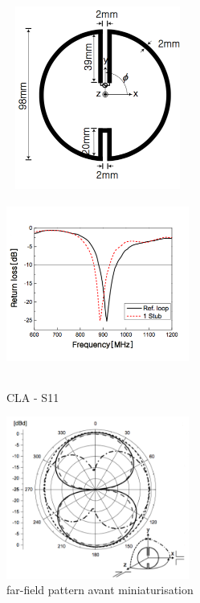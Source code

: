 \documentclass[11pt, a4paper, twoside]{book}
\begin{document}
\begin{figure}[H]
\centering
\includegraphics[width=6cm, height=6cm]{stuba}
\includegraphics[width=6cm, height=6cm]{stubb}
\caption{CLA - S11}
\end{figure}

\begin{figure}[H]
\centering
\includegraphics[width=6cm]{lob}
\caption{far-field pattern avant miniaturisation}
\end{figure}
\end{document}
